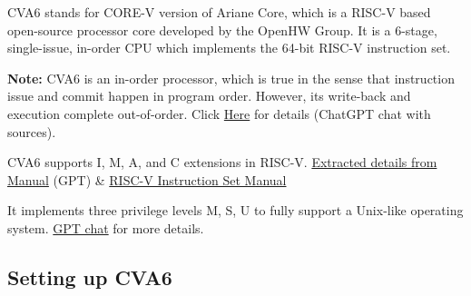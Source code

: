 \documentclass[12pt, a4paper]{article}
\begin{document}
\vspace{0.4em}

CVA6 stands for CORE-V version of Ariane Core, which is a RISC-V based open-source processor core developed by the OpenHW Group. It is a 6-stage, single-issue, in-order CPU which implements the 64-bit RISC-V instruction set.

\vspace{0.4em}

\textbf{Note:} CVA6 is an in-order processor, which is true in the sense that instruction issue and commit happen in program order. However, its write-back and execution complete out-of-order. Click \href{https://chatgpt.com/s/t_6859b47774988191b23e0e92336e7668}{Here} for details (ChatGPT chat with sources).

\vspace{0.4em}

CVA6 supports I, M, A, and C extensions in RISC-V. \href{https://chatgpt.com/s/t_6859b7c99a1481919e4f0061d34eb39e}{Extracted details from Manual} (GPT) \& \href{https://www2.eecs.berkeley.edu/Pubs/TechRpts/2016/EECS-2016-118.pdf}{RISC-V Instruction Set Manual}

\vspace{0.4em}

It implements three privilege levels M, S, U to fully support a Unix-like operating system.
\href{https://chatgpt.com/s/t_6859b8e04be88191863e1d50b57d0f11}{GPT chat} for more details.

\subsection{Setting up CVA6}
\end{document}

